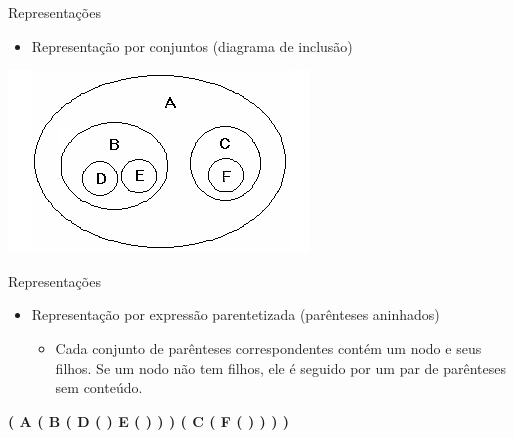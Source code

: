 \documentclass[12pt,table,xcolor={dvipsnames}]{beamer}
\begin{document}
\begin{frame}[fragile]{Representações}
          \begin{itemize}
		  \item Representação por conjuntos (diagrama de inclusão)
          \end{itemize}
          \begin{center}
          \includegraphics[scale=.95]{sets.png} 
          \end{center}
\end{frame} 

\begin{frame}[fragile]{Representações}
\begin{itemize}
\item Representação por expressão parentetizada (parênteses aninhados)
\begin{itemize}
\item  Cada conjunto de parênteses correspondentes contém um nodo e seus filhos. Se um nodo não tem filhos, ele é seguido por um par de parênteses sem conteúdo.
\end{itemize}
\end{itemize}
\begin{center}
\textbf{( A ( B ( D ( ) E ( ) ) ) ( C ( F ( ) ) ) )}
\end{center}
\end{frame}
\end{document}
